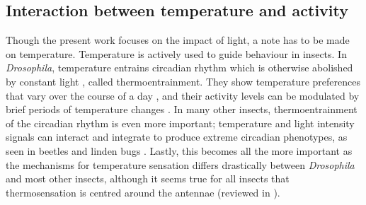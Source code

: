 \subsection{Interaction between temperature and activity}
Though the present work focuses on the impact of light, a note has to be made on temperature. Temperature is actively used to guide behaviour in insects. In \textit{Drosophila}, temperature entrains circadian rhythm which is otherwise abolished by constant light \citep{Yoshii2005}, called thermoentrainment. They show temperature preferences that vary over the course of a day \citep{Kaneko2012}, and their activity levels can be modulated by brief periods of temperature changes \citep{Alpert2020}. In many other insects, thermoentrainment of the circadian rhythm is even more important; temperature and light intensity signals can interact and integrate to produce extreme circadian phenotypes, as seen in beetles and linden bugs \citep{Constantinou1985,Kaniewska2020}. Lastly, this becomes all the more important as the mechanisms for temperature sensation differs drastically between \textit{Drosophila} and most other insects, although it seems true for all insects that thermosensation is centred around the antennae (reviewed in \citealt{Gonzalez-Tokman2020a}).






